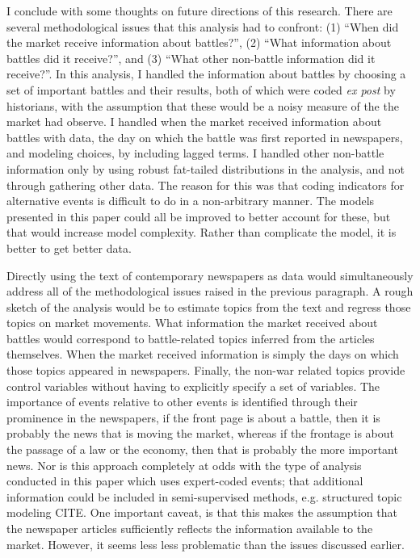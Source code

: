 I conclude with some thoughts on future directions of this research.
There are several methodological issues that this analysis had to confront: (1) ``When did the market receive information about battles?'', (2) ``What information about battles did it receive?'', and (3) ``What other non-battle information did it receive?''.
In this analysis, I handled the information about battles by choosing a set of important battles and their results, both of which were coded \textit{ex post} by historians,  with the assumption that these would be a noisy measure of the the market had observe.
I handled when the market received information about battles with data, the day on which the battle was first reported in newspapers, and modeling choices, by including lagged terms.
I handled other non-battle information only by using robust fat-tailed distributions in the analysis, and not through gathering other data.
The reason for this was that coding indicators for alternative events is difficult to do in a non-arbitrary manner.
The models presented in this paper could all be improved to better account for these, but that would increase model complexity.
Rather than complicate the model, it is better to get better data.

Directly using the text of contemporary newspapers as data would simultaneously address all of the methodological issues raised in the previous paragraph.
A rough sketch of the analysis would be to estimate topics from the text and regress those topics on market movements.
What information the market received about battles would correspond to battle-related topics inferred from the articles themselves.
When the market received information is simply the days on which those topics appeared in newspapers.
Finally, the non-war related topics provide control variables without having to explicitly specify a set of variables.
The importance of events relative to other events is identified through their prominence in the newspapers, \eg{}if the front page is about a battle, then it is probably the news that is moving the market, whereas if the frontage is about the passage of a law or the economy, then that is probably the more important news.
Nor is this approach completely at odds with the type of analysis conducted in this paper which uses expert-coded events; that additional information could be included in semi-supervised methods, e.g. structured topic modeling CITE.
One important caveat, is that this makes the assumption that the newspaper articles sufficiently reflects the information available to the market.
However, it seems less less problematic than the issues discussed earlier.


